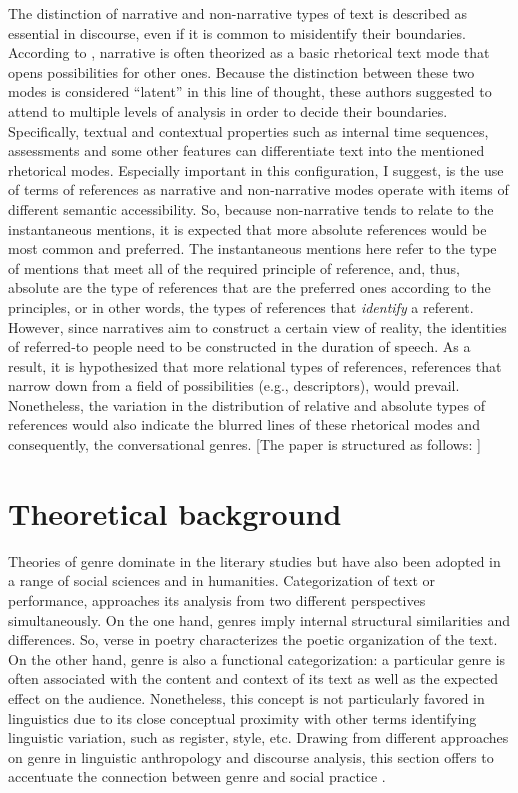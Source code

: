 \documentclass[12pt]{article}
\begin{document}
The distinction of narrative and non-narrative types of text is described as essential in discourse, even if it is common to misidentify their boundaries. According to \textcite{georgakopoulou2000}, narrative is often theorized as a basic rhetorical text mode that opens possibilities for other ones. Because the distinction between these two modes is considered ``latent'' in this line of thought, these authors suggested to attend to multiple levels of analysis in order to decide their boundaries. Specifically, textual and contextual properties such as internal time sequences, assessments and some other features can differentiate text into the mentioned rhetorical modes. Especially important in this configuration, I suggest, is the use of terms of references as narrative and non-narrative modes operate with items of different semantic accessibility. So, because non-narrative tends to relate to the instantaneous mentions, it is expected that more absolute references would be most common and preferred. The instantaneous mentions here refer to the type of mentions that meet all of the required principle of reference, and, thus, absolute are the type of references that are the preferred ones according to the principles, or in other words, the types of references that \textit{identify} a referent. However, since narratives aim to construct a certain view of reality, the identities of referred-to people need to be constructed in the duration of speech. As a result, it is hypothesized that more relational types of references, references that narrow down from a field of possibilities (e.g., descriptors), would prevail. Nonetheless, the variation in the distribution of relative and absolute types of references would also indicate the blurred lines of these rhetorical modes and consequently, the conversational genres.  
[The paper is structured as follows: ]
\section{Theoretical background}
Theories of genre dominate in the literary studies but have also been adopted in a range of social sciences and in humanities. Categorization of text or performance, approaches its analysis from two different perspectives simultaneously. On the one hand, genres imply internal structural similarities and differences. So, verse in poetry characterizes the poetic organization of the text. On the other hand, genre is also a functional categorization: a particular genre is often associated with the content and context of its text as well as the expected effect on the audience. Nonetheless, this concept is not particularly favored in linguistics due to its close conceptual proximity with other terms identifying linguistic variation, such as register, style, etc. Drawing from different approaches on genre in linguistic anthropology and discourse analysis, this section offers to accentuate the connection between genre and social practice \parencite{hanks1987}.  
\end{document}
